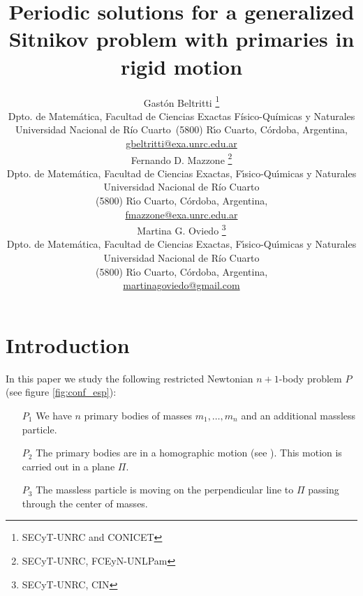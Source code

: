 \documentclass[twoside]{article}
\title{Periodic solutions for a generalized Sitnikov problem with primaries in rigid motion}
\author{Gast\'on Beltritti \thanks{SECyT-UNRC and CONICET}\\
Dpto. de Matem\'atica, Facultad de Ciencias Exactas Físico-Químicas y Naturales\\
Universidad Nacional de R\'{i}o Cuarto\
(5800) R\'{\i}o Cuarto, C\'ordoba, Argentina,\\
\url{gbeltritti@exa.unrc.edu.ar}\\[3mm]
Fernando D. Mazzone \thanks{SECyT-UNRC, FCEyN-UNLPam}\\
Dpto. de Matem\'atica, Facultad de Ciencias Exactas, F\'{\i}sico-Qu\'{\i}micas y Naturales\\
Universidad Nacional de R\'{i}o Cuarto\\
(5800) R\'{\i}o Cuarto, C\'ordoba, Argentina,\\
\url{fmazzone@exa.unrc.edu.ar}\\
Martina G. Oviedo \thanks{SECyT-UNRC, CIN}\\
Dpto. de Matem\'atica, Facultad de Ciencias Exactas, F\'{\i}sico-Qu\'{\i}micas y Naturales\\
Universidad Nacional de R\'{i}o Cuarto\\
(5800) R\'{\i}o Cuarto, C\'ordoba, Argentina,\\
\url{martinagoviedo@gmail.com}
}
\date{}
\theoremstyle{remark}
\begin{document}
\maketitle
%
%
%
%
%

\begin{abstract}


\end{abstract}




\pagestyle{fancy} \headheight 35pt \fancyhead{} \fancyfoot{}

\fancyfoot[C]{\thepage}  \fancyhead[CO]{\nouppercase{\section}}

\fancyhead[CO]{\nouppercase{\leftmark}}






\section{Introduction}
In this paper we study the following restricted  Newtonian $n+1$-body problem $P$ (see figure \ref{fig:conf_esp}):
\begin{itemize}
 \item[$P_1$] We have $n$ primary bodies of masses $m_1,\ldots,m_n$ and an additional massless particle.
 \item[$P_2$] The primary bodies are in a homographic motion (see \cite[Section 2.9]{JaumeLlibre276}). This motion is carried out in a plane $\Pi$.
 \item[$P_3$] The massless particle is moving  on the perpendicular line to $\Pi$ passing through the center of masses.
\end{itemize}
\end{document}

